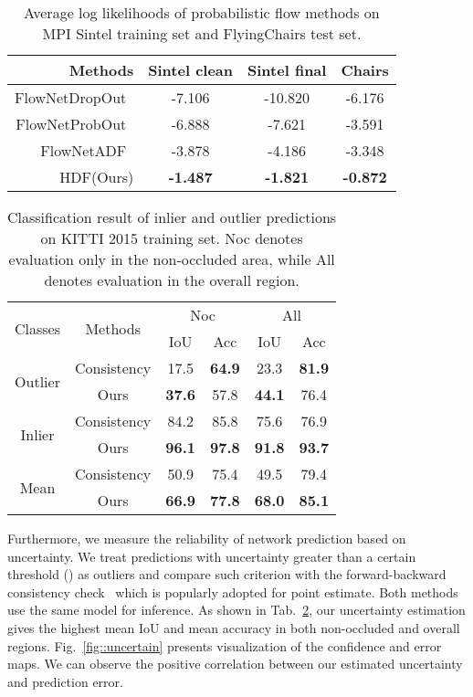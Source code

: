 \begin{table}[tbh]
\small
\centering
\setlength{\tabcolsep}{5pt}
\begin{tabular*}{1.0\linewidth}{r | c c c }
\toprule
Methods & Sintel clean & Sintel final & Chairs \\
\midrule
FlowNetDropOut~\cite{gast2018lightweight} & -7.106 & -10.820 & -6.176 \\
FlowNetProbOut~\cite{gast2018lightweight} & -6.888 & -7.621 & -3.591 \\
FlowNetADF~\cite{gast2018lightweight} & -3.878 & -4.186 & -3.348 \\
\midrule
HDF(Ours) & \bf{-1.487} & \bf{-1.821} & \bf{-0.872} \\
\bottomrule
\end{tabular*}
\caption{Average log likelihoods of probabilistic flow methods on MPI Sintel training set and FlyingChairs test set.}
\vspace{-1ex}
\label{tab:flow_uncertainty}
\end{table}

\begin{table}[tbh]
\small
\centering
\setlength{\tabcolsep}{8.5pt}
\begin{tabular*}{1.0\linewidth}{c | c | c  c | c  c}
\toprule
\multirow{2}{*}{Classes} & \multirow{2}{*}{Methods} & \multicolumn{2}{c|}{Noc} &  \multicolumn{2}{c}{All} \\
 & & IoU & Acc & IoU & Acc\\
\midrule
\multirow{2}{*}{Outlier} & Consistency & 17.5 & \bf{64.9} & 23.3 & \bf{81.9} \\
& Ours & \bf{37.6} & 57.8 & \bf{44.1} & 76.4 \\
\midrule
\multirow{2}{*}{Inlier}& Consistency & 84.2 & 85.8 & 75.6 & 76.9 \\
& Ours & \bf{96.1} & \bf{97.8} & \bf{91.8} & \bf{93.7} \\
\midrule
\multirow{2}{*}{Mean}& Consistency & 50.9 & 75.4 & 49.5 & 79.4 \\
& Ours & \bf{66.9} & \bf{77.8} & \bf{68.0} & \bf{85.1} \\
\bottomrule
\end{tabular*}
\vspace{0.5ex}
\caption{Classification result of inlier and outlier predictions on KITTI 2015 training set. Noc denotes evaluation only in the non-occluded area, while All denotes evaluation in the overall region.}
\vspace{-1ex}
\label{tab:uncer_error}
\end{table}

Furthermore, we measure the reliability of network prediction based on uncertainty. We treat predictions with uncertainty greater than a certain threshold () as outliers and compare such criterion with the forward-backward consistency check~\cite{yin2018geonet} which is popularly adopted for point estimate. Both methods use the same \flowmodelname model for inference. As shown in Tab.~\ref{tab:uncer_error}, our uncertainty estimation gives the highest mean IoU and mean accuracy in both non-occluded and overall regions. 
Fig.~\ref{fig::uncertain} presents visualization of the confidence and error maps.
We can observe the positive correlation between our estimated uncertainty and prediction error.
